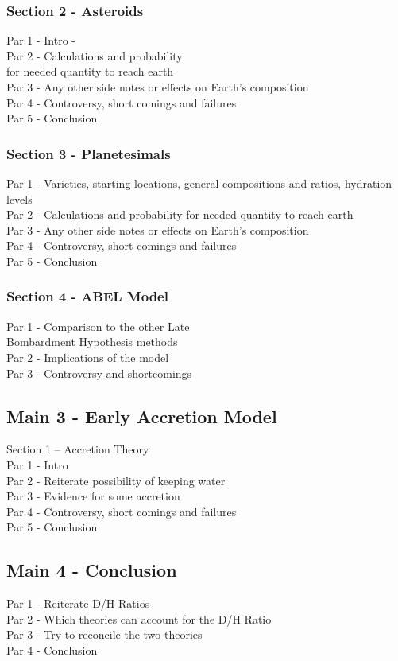 \subsubsection{Section 2 - Asteroids}
Par 1 - Intro -\\
Par 2 - Calculations and probability\\ for needed quantity to reach earth\\
Par 3 - Any other side notes or effects on Earth’s composition\\
Par 4 - Controversy, short comings and failures\\
Par 5 - Conclusion\\

\subsubsection{Section 3 - Planetesimals}
Par 1 - Varieties, starting locations, general compositions and ratios, hydration levels\\
Par 2 - Calculations and probability for needed quantity to reach earth\\
Par 3 - Any other side notes or effects on Earth’s composition\\
Par 4 - Controversy, short comings and failures\\
Par 5 - Conclusion\\

\subsubsection{Section 4 - ABEL Model}
Par 1 - Comparison to the other Late\\ Bombardment Hypothesis methods\\
Par 2 - Implications of the model\\
Par 3 - Controversy and shortcomings\\

\subsection{Main 3 - Early Accretion Model}
Section 1 – Accretion Theory\\
Par 1 - Intro\\
Par 2 - Reiterate possibility of keeping water\\
Par 3 - Evidence for some accretion\\
Par 4 - Controversy, short comings and failures\\
Par 5 - Conclusion\\

\subsection{Main 4 - Conclusion}
Par 1 - Reiterate D/H Ratios\\
Par 2 - Which theories can account for the D/H Ratio\\
Par 3 - Try to reconcile the two theories\\
Par 4 - Conclusion\\